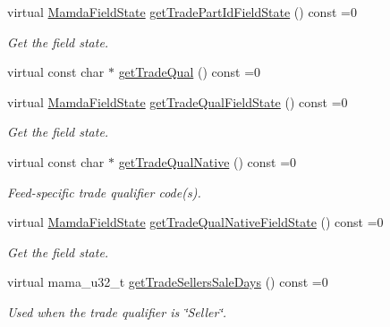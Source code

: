 \begin{CompactItemize}
virtual \hyperlink{namespaceWombat_93aac974f2ab713554fd12a1fa3b7d2a}{Mamda\-Field\-State} \hyperlink{classWombat_1_1MamdaTradePossiblyDuplicate_67970ff40f57b63e0ef46f280947a641}{get\-Trade\-Part\-Id\-Field\-State} () const =0
\begin{CompactList}\small\item\em Get the field state. \item\end{CompactList}\item 
virtual const char $\ast$ \hyperlink{classWombat_1_1MamdaTradePossiblyDuplicate_62f7b023cc1c27db3e18ace440695d68}{get\-Trade\-Qual} () const =0
\item 
virtual \hyperlink{namespaceWombat_93aac974f2ab713554fd12a1fa3b7d2a}{Mamda\-Field\-State} \hyperlink{classWombat_1_1MamdaTradePossiblyDuplicate_471d0034889bada3b664ad8dbca21b41}{get\-Trade\-Qual\-Field\-State} () const =0
\begin{CompactList}\small\item\em Get the field state. \item\end{CompactList}\item 
virtual const char $\ast$ \hyperlink{classWombat_1_1MamdaTradePossiblyDuplicate_ea042cedf017d3e9b495a68e20879de7}{get\-Trade\-Qual\-Native} () const =0
\begin{CompactList}\small\item\em Feed-specific trade qualifier code(s). \item\end{CompactList}\item 
virtual \hyperlink{namespaceWombat_93aac974f2ab713554fd12a1fa3b7d2a}{Mamda\-Field\-State} \hyperlink{classWombat_1_1MamdaTradePossiblyDuplicate_c74fec65a80f2b42976ebb509a9abfeb}{get\-Trade\-Qual\-Native\-Field\-State} () const =0
\begin{CompactList}\small\item\em Get the field state. \item\end{CompactList}\item 
virtual mama\_\-u32\_\-t \hyperlink{classWombat_1_1MamdaTradePossiblyDuplicate_96cd3f338219a7dd5c9cb3d7b761296d}{get\-Trade\-Sellers\-Sale\-Days} () const =0
\begin{CompactList}\small\item\em Used when the trade qualifier is \char`\"{}Seller\char`\"{}. \item\end{CompactList}\item 

\end{CompactItemize}
